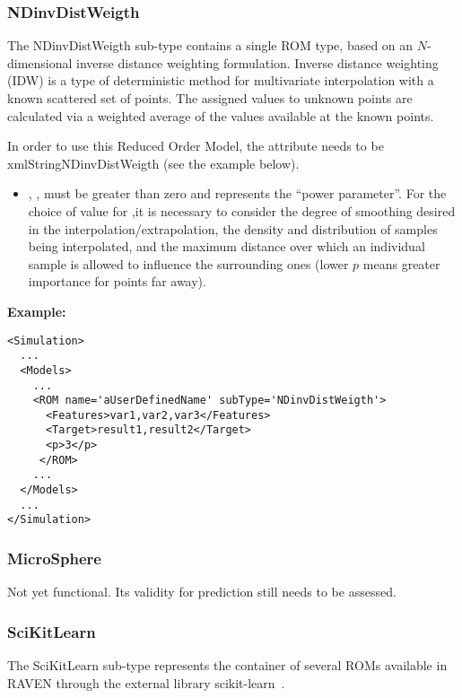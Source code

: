 \subsubsection{NDinvDistWeigth}
\label{subsubsec:NDinvDistWeigth}
The NDinvDistWeigth sub-type contains a single ROM type, based on an
$N$-dimensional inverse distance weighting formulation.
%
Inverse distance weighting (IDW) is a type of deterministic method for
multivariate interpolation with a known scattered set of points.
%
The assigned values to unknown points are calculated via a weighted average of
the values available at the known points.
%

In order to use this Reduced Order Model, the  attribute
 needs to be xmlString{NDinvDistWeigth} (see the example 
below).
%
\subnodeIntro

\begin{itemize}
  \item {}, , must be greater than
  zero and represents the ``power parameter''.
  For the choice of value for ,it is necessary to consider the degree
  of smoothing desired in the interpolation/extrapolation, the density and
  distribution of samples being interpolated, and the maximum distance over
  which an individual sample is allowed to influence the surrounding ones (lower
  $p$ means greater importance for points far away).
\end{itemize}

\textbf{Example:}
\begin{lstlisting}[style=XML,morekeywords={name,subType}]
<Simulation>
  ...
  <Models>
    ...
    <ROM name='aUserDefinedName' subType='NDinvDistWeigth'>
      <Features>var1,var2,var3</Features>
      <Target>result1,result2</Target>
      <p>3</p>
     </ROM>
    ...
  </Models>
  ...
</Simulation>
\end{lstlisting}
\subsubsection{MicroSphere}
\label{subsubsec:microSphere}
Not yet functional.
%
Its validity for prediction still needs to be assessed.
%
\subsubsection{SciKitLearn}
\label{subsubsec:SciKitLearn}
The SciKitLearn sub-type represents the container of several ROMs available in
RAVEN through the external library scikit-learn~\cite{SciKitLearn}.
%

